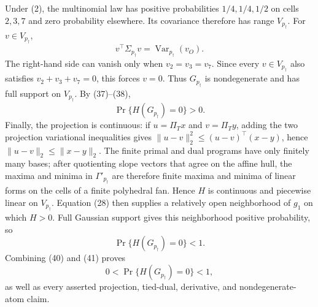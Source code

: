 Under (2), the multinomial law has positive probabilities \(1/4,1/4,1/2\) on cells \(2,3,7\) and zero probability elsewhere.  Its covariance therefore has range \(V_{p_\dagger}\).  For \(v\in V_{p_\dagger}\),
\[
v^\top\Sigma_{p_\dagger}v
=\operatorname{Var}_{p_\dagger}(v_O).
\tag{39}
\]
The right-hand side can vanish only when \(v_2=v_3=v_7\).  Since every \(v\in V_{p_\dagger}\) also satisfies \(v_2+v_3+v_7=0\), this forces \(v=0\).  Thus \(G_{p_\dagger}\) is nondegenerate and has full support on \(V_{p_\dagger}\).  By (37)--(38),
\[
\Pr\{H(G_{p_\dagger})=0\}>0.
\tag{40}
\]
Finally, the projection is continuous: if \(u=\Pi_Tx\) and \(v=\Pi_Ty\), adding the two projection variational inequalities gives \(\|u-v\|_2^2\leq(u-v)^\top(x-y)\), hence \(\|u-v\|_2\leq\|x-y\|_2\).  The finite primal and dual programs have only finitely many bases; after quotienting slope vectors that agree on the affine hull, the maxima and minima in \(\Gamma'_{p_\dagger}\) are therefore finite maxima and minima of linear forms on the cells of a finite polyhedral fan.  Hence \(H\) is continuous and piecewise linear on \(V_{p_\dagger}\).  Equation (28) then supplies a relatively open neighborhood of \(g_1\) on which \(H>0\).  Full Gaussian support gives this neighborhood positive probability, so
\[
\Pr\{H(G_{p_\dagger})=0\}<1.
\tag{41}
\]
Combining (40) and (41) proves
\[
0<\Pr\{H(G_{p_\dagger})=0\}<1,
\]
as well as every asserted projection, tied-dual, derivative, and nondegenerate-atom claim.
